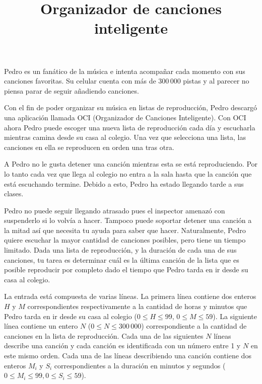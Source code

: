 \documentclass{oci}
\title{Organizador de canciones inteligente}
\begin{document}
\begin{problemDescription}
Pedro es un fanático de la música e intenta acompañar cada momento con sus
canciones favoritas.
Su celular cuenta con más de 300\,000 pistas y al parecer no piensa parar de seguir
añadiendo canciones.

Con el fin de poder organizar su música en listas de reproducción, Pedro
descargó una aplicación llamada OCI (Organizador de Canciones Inteligente).
Con OCI ahora Pedro puede escoger una nueva lista de reproducción cada día y
escucharla mientras camina desde su casa al colegio.
Una vez que selecciona una lista, las canciones en ella se reproducen en orden
una tras otra.

A Pedro no le gusta detener una canción mientras esta se está reproduciendo.
Por lo tanto cada vez que llega al colegio no entra a la sala hasta que la
canción que está escuchando termine.
Debido a esto, Pedro ha estado llegando tarde a sus clases.

Pedro no puede seguir llegando atrasado pues el inspector amenazó
con suspenderlo si lo volvía a hacer.
Tampoco puede soportar detener una canción a la mitad así que necesita tu ayuda
para saber que hacer.
Naturalmente, Pedro quiere escuchar la mayor cantidad de canciones posibles,
pero tiene un tiempo limitado.
Dada una lista de reproducción, y la duración de cada una de sus canciones, tu
tarea es determinar cuál es la última canción de la lista que es posible
reproducir por completo dado el tiempo que Pedro tarda en ir desde su casa al
colegio.

\end{problemDescription}

\begin{inputDescription}
  La entrada está compuesta de varias líneas.
  La primera línea contiene dos enteros $H$ y $M$ correspondientes
  respectivamente a la cantidad de horas y minutos que Pedro tarda en ir desde su
  casa al colegio ($0\leq H\leq 99$, $0\leq M\leq 59$).
  La siguiente línea contiene un entero $N$ ($0\leq N\leq 300\,000$)
  correspondiente a la cantidad de canciones en la lista de reproducción.
  Cada una de las siguientes $N$ líneas describe una canción y cada canción es
  identificada con un número entre 1 y $N$ en este mismo orden.
  Cada una de las líneas describiendo una canción contiene dos enteros $M_i$ y $S_i$
  correspondientes a la duración en minutos y segundos ($0\leq
  M_i\leq 99, 0\leq S_i\leq 59$).
\end{inputDescription}
\end{document}
